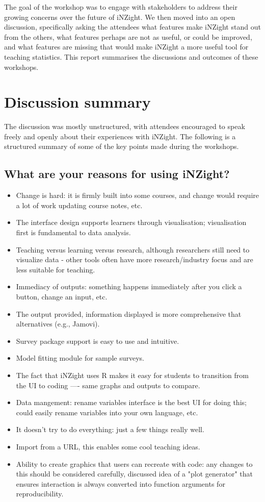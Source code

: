 \documentclass{article}
\begin{document}
The goal of the workshop was to engage with stakeholders to address their growing concerns over the future of iNZight.
We then moved into an open discussion, specifically asking the attendees what features make iNZight stand out from the others, what features perhaps are not as useful, or could be improved, and what features are missing that would make iNZight a more useful tool for teaching statistics.
This report summarises the discussions and outcomes of these workshops.


\section{Discussion summary}

The discussion was mostly unstructured, with attendees encouraged to speak freely and openly about their experiences with iNZight.
The following is a structured summary of some of the key points made during the workshops.

\subsection{What are your reasons for using iNZight?}

\begin{itemize}
    \item Change is hard: it is firmly built into some courses, and change would require a lot of work updating course notes, etc.
    \item The interface design supports learners through visualisation; visualisation first is fundamental to data analysis.
    \item Teaching versus learning versus research, although researchers still need to visualize data - other tools often have more research/industry focus and are less suitable for teaching.
    \item Immediacy of outputs: something happens immediately after you click a button, change an input, etc.
    \item The output provided, information displayed is more comprehensive that alternatives (e.g., Jamovi).
    \item Survey package support is easy to use and intuitive.
    \item Model fitting module for sample surveys.
    \item The fact that iNZight uses R makes it easy for students to transition from the UI to coding ---- same graphs and outputs to compare.
    \item Data mangement: rename variables interface is the best UI for doing this; could easily rename variables into your own language, etc.
    \item It doesn't try to do everything: just a few things really well.
    \item Import from a URL, this enables some cool teaching ideas.
    \item Ability to create graphics that users can recreate with code: any changes to this should be considered carefully, discussed idea of a "plot generator" that ensures interaction is always converted into function arguments for reproducibility.
\end{itemize}
\end{document}
